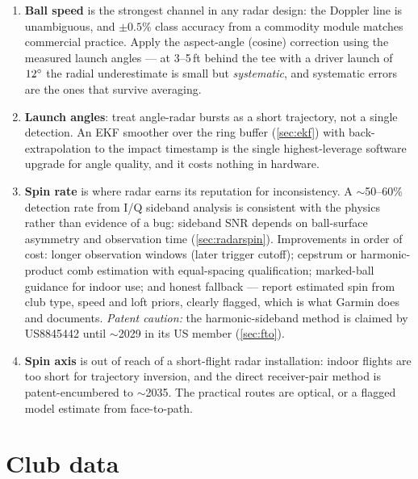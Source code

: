 \begin{enumerate}
\item \textbf{Ball speed} is the strongest channel in any radar design: the
Doppler line is unambiguous, and $\pm0.5\%$ class accuracy from a commodity
module matches commercial practice. Apply the aspect-angle (cosine)
correction using the measured launch angles --- at 3--5\,ft behind the tee
with a driver launch of $12\si{\degree}$ the radial underestimate is small but
\emph{systematic}, and systematic errors are the ones that survive
averaging.
\item \textbf{Launch angles}: treat angle-radar bursts as a short
trajectory, not a single detection. An EKF smoother over the ring buffer
(\cref{sec:ekf}) with back-extrapolation to the impact timestamp is the
single highest-leverage software upgrade for angle quality, and it costs
nothing in hardware.
\item \textbf{Spin rate} is where radar earns its reputation for
inconsistency. A $\sim$50--60\% detection rate from I/Q sideband analysis is
consistent with the physics rather than evidence of a bug: sideband SNR
depends on ball-surface asymmetry and observation time
(\cref{sec:radarspin}). Improvements in order of cost: longer observation
windows (later trigger cutoff); cepstrum or harmonic-product comb estimation
with equal-spacing qualification; marked-ball guidance for indoor use; and
honest fallback --- report estimated spin from club type, speed and loft
priors, clearly flagged, which is what Garmin does and documents.
\emph{Patent caution:} the harmonic-sideband method is claimed by US8845442
until $\sim$2029 in its US member (\cref{sec:fto}).
\item \textbf{Spin axis} is out of reach of a short-flight radar
installation: indoor flights are too short for trajectory inversion, and the
direct receiver-pair method is patent-encumbered to $\sim$2035. The
practical routes are optical, or a flagged model estimate from face-to-path.
\end{enumerate}

\section{Club data}

